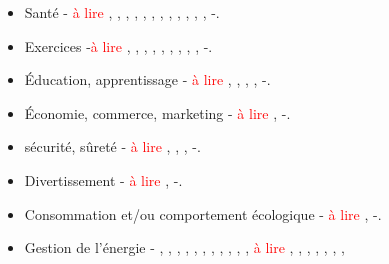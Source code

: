 \documentclass[10pt,a5paper,twoside]{article}
\begin{document}
\begin{enumerate}
  \begin{itemize}
  \itemsep1pt\parskip0pt
  \item
    Santé - \textcolor{red}{à lire} \citet{bhatnagar2012biometric},
    \citet{chiu2009playful}, \citet{fabri2013changing},
    \citet{gasca2008persuasive}, \citet{halan2010high},
    \citet{kehr2012transformational}, \citet{kroes2013empowering},
    \citet{lee2011mining}, \citet{looije2006incorporating},
    \citet{nakajima2013designing}, \citet{parmar2008persuasive},
    \citet{salam2010using}, \citet{vanleer2012use} -.
  \item
    Exercices -\textcolor{red}{à lire} \citet{arteaga2010mobile},
    \citet{berkovsky2012physical}, \citet{consolvo2008flowers},
    \citet{consolvo2008activity}, \citet{foster2010motivating},
    \citet{lacroix2009understanding}, \citet{lim2010pediluma},
    \citet{mutsuddi2012text}, \citet{ploderer2008hey},
    \citet{young2010twitter} -.
  \item
    Éducation, apprentissage - \textcolor{red}{à lire}
    \citet{berque2011design}, \citet{chang2008playful},
    \citet{goh2012impact}, \citet{lucero2006persuasive},
    \citet{reis2011perception} -.
  \item
    Économie, commerce, marketing - \textcolor{red}{à lire}
    \citet{cugelman2008website}, \citet{russell2008benevolence} -.
  \item
    sécurité, sûreté - \textcolor{red}{à lire}
    \citet{bergmans2013reducing}, \citet{chittaro2012passengers},
    \citet{hartwig2013safety}, \citet{miranda2013examining} -.
  \item
    Divertissement - \textcolor{red}{à lire}
    \citet{centieiro2012applaud}, \citet{reitberger2012persuasive} -.
  \item
    Consommation et/ou comportement écologique - \textcolor{red}{à lire}
    \citet{centieiro2011location}, \citet{ruijten2012bridging} -.
  \item
    Gestion de l'énergie - \citet{ham2010ambient},
    \citet{medland2010curbing} , \citet{rodgers2011exploring},
    \citet{gamberini2012tailoring}, \citet{costanza2012understanding},
    \citet{weiss2009handy}, \citet{pereira2013understanding},
    \citet{elsmore2010neighbourhood}, \citet{petkov2012personalised},
    \citet{kjeldskov2012using}, \citet{paay2014design},
    \textcolor{red}{à lire} \citet{filonik2013customisable},
    \citet{foster2010wattsup}, \citet{gamberini2012tailoring},
    \citet{kim2010design}, \citet{roubroeks2010dominant},
    \citet{ruijten2012bridging}, \citet{ruijten2011unconscious},

\end{itemize}
\end{enumerate}
\end{document}
